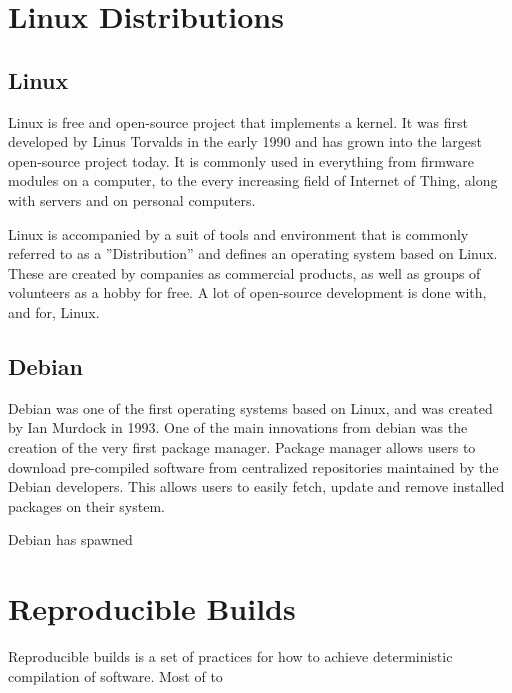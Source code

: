 \documentclass[../Main/thesis.tex]{subfiles}
\begin{document}
\section{Linux Distributions}\label{sec:linux_distributions}
    \subsection*{Linux}
    Linux is free and open-source project that implements a kernel. It was first
    developed by Linus Torvalds in the early 1990 and has grown into the largest
    open-source project today. It is commonly used in everything from firmware
    modules on a computer, to the every increasing field of Internet of Thing,
    along with servers and on personal computers.

    Linux is accompanied by a suit of tools and environment that is commonly
    referred to as a ''Distribution'' and defines an operating system based on
    Linux. These are created by companies as commercial products, as well as
    groups of volunteers as a hobby for free. A lot of open-source development
    is done with, and for, Linux.

    \subsection*{Debian}
    Debian was one of the first operating systems based on Linux, and was
    created by Ian Murdock in 1993. One of the main innovations from debian was
    the creation of the very first package manager. Package manager allows users
    to download pre-compiled software from centralized repositories maintained
    by the Debian developers.  This allows users to easily fetch, update and
    remove installed packages on their system.

    Debian has spawned 


\section{Reproducible Builds}\label{sec:reproducible_builds}

    Reproducible builds is a set of practices for how to achieve deterministic
    compilation of software. Most of to


\end{document}
